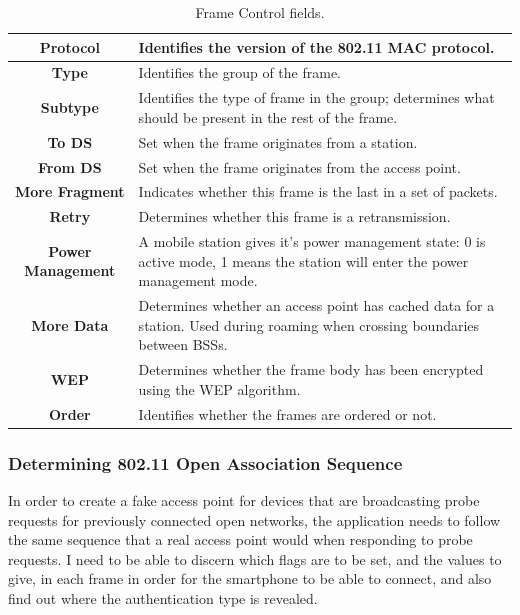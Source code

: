 \begin{table}[!h]
\begin{center}
	\begin{tabular}{ | c |  p{5cm} | }
 		\hline
		\textbf{Protocol} & Identifies the version of the 802.11 MAC protocol. \\ \hline
		\textbf{Type} & Identifies the group of the frame. \\ \hline
		\textbf{Subtype} & Identifies the type of frame in the group; determines what should be present in the rest of the frame. \\ \hline
		\textbf{To DS} & Set when the frame originates from a station. \\ \hline
		\textbf{From DS} & Set when the frame originates from the access point. \\ \hline
		\textbf{More Fragment} & Indicates whether this frame is the last in a set of packets. \\ \hline
		\textbf{Retry} & Determines whether this frame is a retransmission. \\ \hline
		\textbf{Power Management} & A mobile station gives it’s power management state: 0 is active mode, 1  means the station will enter the power management mode. \\ \hline
		\textbf{More Data} & Determines whether an access point has cached data for a station. Used during roaming when crossing boundaries between BSSs. \\ \hline
		\textbf{WEP} & Determines whether the frame body has been encrypted using the WEP \cite{research:wep} algorithm.  \\ \hline
		\textbf{Order} & Identifies whether the frames are ordered or not. \\ \hline
	\end{tabular}
		\caption{Frame Control fields.}
		\label{table:framecontrol}
\end{center}
\end{table}
\clearpage
\subsubsection{Determining 802.11 Open Association Sequence}
In order to create a fake access point for devices that are broadcasting probe requests for previously connected open networks, the application needs to follow the same sequence that a real access point would when responding to probe requests. I need to be able to discern which flags are to be set, and the values to give, in each frame in order for the smartphone to be able to connect, and also find out where the authentication type is revealed. 

